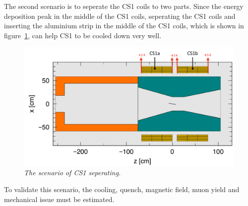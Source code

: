 The second scenario is to seperate the CS1 coils to two parts.
Since the energy deposition peak in the middle of the CS1 coils, seperating the CS1 coils and inserting the aluminium strip in the middle of the CS1 coils, which is shown in figure~\ref{5new}, can help CS1 to be cooled down very well.
\begin{figure}[H]
 \centering
 \includegraphics[scale=0.4]{chapter6/fig/CS1new.pdf}
 \caption{\it The scenario of CS1 seperating.}
 \label{5new}
\end{figure}
To validate this scenario, the cooling, quench, magnetic field, muon yield and mechanical issue must be estimated.


